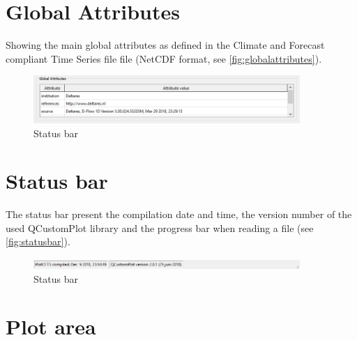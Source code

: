 \documentclass{deltares_memo}
\newcommand{\qcustomplot}{QCustomPlot\xspace}
\newcommand{\netcdf}{NetCDF\xspace}
\begin{document}
\section{Global Attributes}
Showing the main global attributes as defined in the Climate and Forecast compliant Time Series file file (\netcdf format, see \autoref{fig:globalattributes}).
\begin{figure}[H]
    \centering    
    \includegraphics[width=0.9\textwidth]{pictures/group_global_attributes.png}
    \caption{Status bar\label{fig:globalattributes}}
\end{figure}

\section{Status bar}
The status bar present the compilation date and time, the version number of the used \qcustomplot library and the progress bar when reading a file (see \autoref{fig:statusbar}).
\begin{figure}[H]
    \centering    
    \includegraphics[width=0.9\textwidth]{pictures/status_bar.png}
    \caption{Status bar\label{fig:statusbar}}
\end{figure}
\section{Plot area\label{sec:howtohandleplot}}
\end{document}

